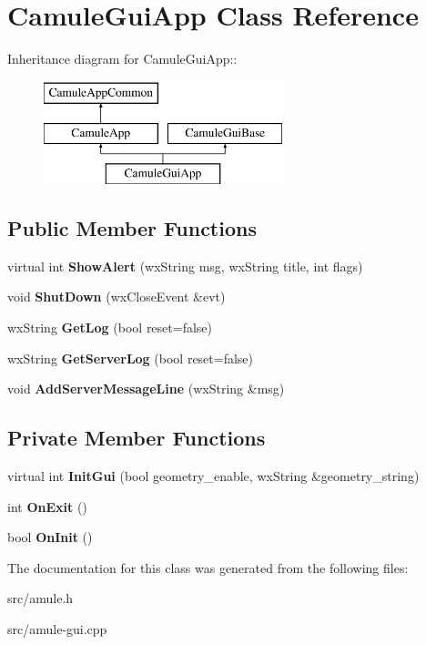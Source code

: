 \section{CamuleGuiApp Class Reference}
\label{classCamuleGuiApp}
Inheritance diagram for CamuleGuiApp::\begin{figure}[H]
\begin{center}
\leavevmode
\includegraphics[height=3cm]{classCamuleGuiApp}
\end{center}
\end{figure}
\subsection*{Public Member Functions}
\begin{DoxyCompactItemize}
\item 
virtual int {\bfseries ShowAlert} (wxString msg, wxString title, int flags)\label{classCamuleGuiApp_a0a0bef5f50577fb3b3950fc5abb6df19}

\item 
void {\bfseries ShutDown} (wxCloseEvent \&evt)\label{classCamuleGuiApp_a329676e105bdbfd22d675f2ce5b4bb81}

\item 
wxString {\bfseries GetLog} (bool reset=false)\label{classCamuleGuiApp_a2f123f389aae38d522011c5b9ba26b14}

\item 
wxString {\bfseries GetServerLog} (bool reset=false)\label{classCamuleGuiApp_a652ffde3da583d2ff51b617488d0b775}

\item 
void {\bfseries AddServerMessageLine} (wxString \&msg)\label{classCamuleGuiApp_a23ec14f89e0ec80553666e5e6cfccc6d}

\end{DoxyCompactItemize}
\subsection*{Private Member Functions}
\begin{DoxyCompactItemize}
\item 
virtual int {\bfseries InitGui} (bool geometry\_\-enable, wxString \&geometry\_\-string)\label{classCamuleGuiApp_a92ee503998853844529f79a1a972e59f}

\item 
int {\bfseries OnExit} ()\label{classCamuleGuiApp_acedc4e23c0d7824eeabc20b129be7f43}

\item 
bool {\bfseries OnInit} ()\label{classCamuleGuiApp_adba8e8d5ba694c07f730ad9dc2e4eafb}

\end{DoxyCompactItemize}


The documentation for this class was generated from the following files:\begin{DoxyCompactItemize}
\item 
src/amule.h\item 
src/amule-\/gui.cpp\end{DoxyCompactItemize}
